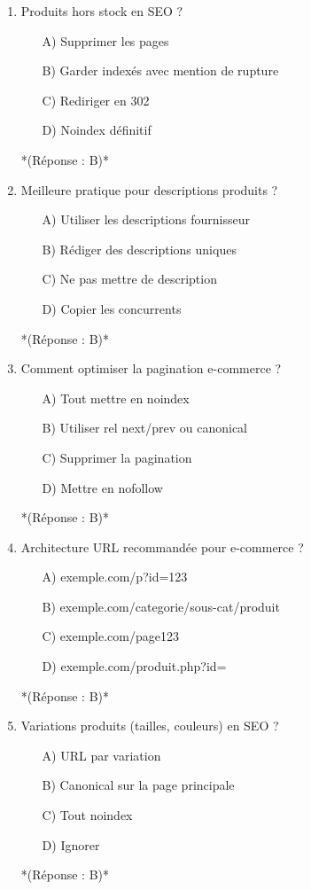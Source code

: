 \documentclass[12pt,a4paper,twoside]{report}
\begin{document}
\begin{enumerate}
\item Produits hors stock en SEO ?
\begin{itemize}
\item[A)] Supprimer les pages
\item[B)] Garder indexés avec mention de rupture
\item[C)] Rediriger en 302
\item[D)] Noindex définitif
\end{itemize}
*(Réponse : B)*

\item Meilleure pratique pour descriptions produits ?
\begin{itemize}
\item[A)] Utiliser les descriptions fournisseur
\item[B)] Rédiger des descriptions uniques
\item[C)] Ne pas mettre de description
\item[D)] Copier les concurrents
\end{itemize}
*(Réponse : B)*

\item Comment optimiser la pagination e-commerce ?
\begin{itemize}
\item[A)] Tout mettre en noindex
\item[B)] Utiliser rel next/prev ou canonical
\item[C)] Supprimer la pagination
\item[D)] Mettre en nofollow
\end{itemize}
*(Réponse : B)*

\item Architecture URL recommandée pour e-commerce ?
\begin{itemize}
\item[A)] exemple.com/p?id=123
\item[B)] exemple.com/categorie/sous-cat/produit
\item[C)] exemple.com/page123
\item[D)] exemple.com/produit.php?id=
\end{itemize}
*(Réponse : B)*

\item Variations produits (tailles, couleurs) en SEO ?
\begin{itemize}
\item[A)] URL par variation
\item[B)] Canonical sur la page principale
\item[C)] Tout noindex
\item[D)] Ignorer
\end{itemize}
*(Réponse : B)*


\end{enumerate}
\end{document}
